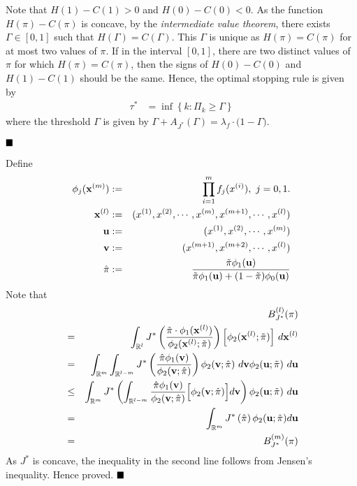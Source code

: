 \documentclass[journal]{IEEEtran}
\newcommand{\BALA}[2]{\phi_2({\bf {#1}};#2)}
\newcommand{\PPHII}[1]{\phi_2({\bf x}^{({#1})} ;\tilde{\pi})}
\begin{document}
Note that  $H(1) - C(1) > 0$ and $H(0) - C(0) <  0$. 
As the function $H(\pi) - C(\pi)$ is concave, by the {\em intermediate 
value theorem}, there exists $\Gamma \in [0,1]$ such that $H(\Gamma) = C(\Gamma)$.
This $\Gamma$ is unique as $H(\pi) = C(\pi)$ for at most two values of $\pi$. 
If in the interval $[0,1]$, there are two distinct values of $\pi$ for 
which $H(\pi) = C(\pi)$, then the signs of $H(0) - C(0)$ and  $H(1)-C(1)$
should be the same.
Hence, the optimal stopping rule is given by
\begin{align*} 
\tau^* & = \inf\left\{k: \Pi_k \ge \Gamma\right\}
\end{align*}
where the threshold $\Gamma$ is given by $\Gamma + A_{J^*}(\Gamma) = \lambda_f\cdot\big(1 - \Gamma\big)$.

$\hfill\blacksquare$



Define 
\begin{eqnarray*}
\phi_j({\bf x}^{(m)}) & := &\prod_{i=1}^m f_j(x^{(i)}), \ j = 0,1.\\ 
{\bf x}^{(l)}         & := &(x^{(1)},   x^{(2)}, \cdots, x^{(m)}, x^{(m+1)}, \cdots, x^{(l)})\\
{\bf u}               & := &(x^{(1)},   x^{(2)}, \cdots, x^{(m)})\\
{\bf v}               & := &(x^{(m+1)}, x^{(m+2)}, \cdots, x^{(l)})\\
\hat{\pi} & := &\frac{\tilde{\pi} \phi_1({\bf u})}{\tilde{\pi} \phi_1({\bf u}) + (1-\tilde{\pi}) \phi_0({\bf u})}
\end{eqnarray*}
Note that
\begin{eqnarray*}
& & B_{J^*}^{(l)}({\pi}) \\
& = &  \int_{{\mathbb R^l}}J^*\left( \frac{{\tilde{\pi}}\cdot\phi_1({\bf x}^{(l)})}{\phi_2({\bf x}^{(l)};\tilde{\pi})}\right)\Big[ \PPHII{l} \Big] \ d{\bf x}^{(l)}\\ 
& = & \int_{{\mathbb R^m}} \int_{\mathbb R^{l-m}} J^*\left(\frac{\hat{\pi} \phi_1({\bf v})} {\BALA{v}{\hat{\pi}}} \right)\BALA{v}{\hat{\pi}} \ d{\bf v}  \BALA{u}{\tilde{\pi}} \  d{\bf u} \\
 & \le & \int_{{\mathbb R^m}} J^*\left(\int_{\mathbb R^{l-m}} \frac{\hat{\pi} \phi_1({\bf v})} {\BALA{v}{\hat{\pi}}} \Big[\BALA{v}{\hat{\pi}}\Big]  d{\bf v} \right) \BALA{u}{\tilde{\pi}} \  d{\bf u} \\
&= & \int_{{\mathbb R^m}} J^*\left(\hat{\pi}\right) \BALA{u}{\tilde{\pi}}  d{\bf u} \\
& = & B_{J^*}^{(m)}({\pi})
\end{eqnarray*}
As $J^*$ is concave, the inequality in the second line follows from Jensen's
inequality. Hence proved.
$\hfill\blacksquare$
\end{document}
